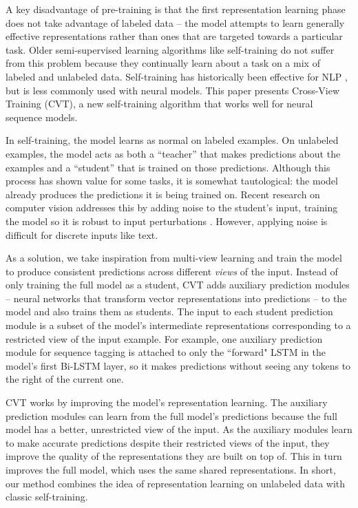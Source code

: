 \documentclass[11pt,a4paper]{article}
\begin{document}
A key disadvantage of pre-training is that the first representation learning phase does not take advantage of labeled data -- the model attempts to learn generally effective representations rather than ones that are targeted towards a particular task.
Older semi-supervised learning algorithms like self-training do not suffer from this problem because they continually learn about a task on a mix of labeled and unlabeled data.
Self-training has historically been effective for NLP \citep{yarowsky1995unsupervised,mcclosky2006effective}, but is less commonly used with neural models.
This paper presents Cross-View Training (CVT), a new self-training algorithm that works well for neural sequence models.

In self-training, the model learns as normal on labeled examples.
On unlabeled examples, the model acts as both a “teacher” that makes predictions about the examples and a “student” that is trained on those predictions. 
Although this process has shown value for some tasks, it is somewhat tautological: the model already produces the predictions it is being trained on. 
Recent research on computer vision addresses this by adding noise to the student's input, training the model so it is robust to input perturbations \citep{sajjadi2016regularization, wei2018improving}.
However, applying noise is difficult for discrete inputs like text.

As a solution, we take inspiration from multi-view learning \citep{blum1998combining, Xu2013ASO} and train the model to produce consistent predictions across different {\it views} of the input. 
Instead of only training the full model as a student, CVT adds auxiliary prediction modules -- neural networks that transform vector representations into predictions -- to the model and also trains them as students.
The input to each student prediction module is a subset of the model's intermediate representations corresponding to a restricted view of the input example.
For example, one auxiliary prediction module for sequence tagging is attached to only the ``forward" LSTM in the model's first Bi-LSTM layer, so it makes predictions without seeing any tokens to the right of the current one.

CVT works by improving the model's representation learning. 
The auxiliary prediction modules can learn from the full model's predictions because the full model has a better, unrestricted view of the input.
As the auxiliary modules learn to make accurate predictions despite their restricted views of the input, they improve the quality of the representations they are built on top of. 
This in turn improves the full model, which uses the same shared representations.
In short, our method combines the idea of representation learning on unlabeled data with classic self-training.
\end{document}
